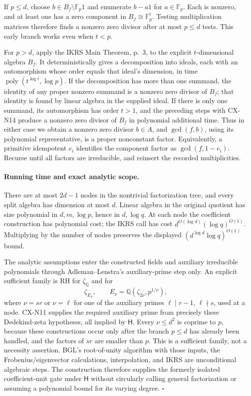 If \(p\leq d\), choose \(b\in B_f\setminus\mathbb F_p1\)
and enumerate \(b-a1\) for \(a\in\mathbb F_p\).
Each is nonzero, and at least one has a zero component in
\(B_f\cong\mathbb F_p^t\).
Testing multiplication matrices therefore finds a nonzero zero
divisor after at most \(p\leq d\) tests.
This early branch works even when \(t<p\).

For \(p>d\), apply the IKRS Main Theorem, p.~3, to the explicit
\(t\)-dimensional algebra \(B_f\).
It deterministically gives a decomposition into ideals, each
with an automorphism whose order equals that ideal's dimension,
in time \(\operatorname{poly}(t^{\log t},\log p)\).
If the decomposition has more than one summand, the identity of
any proper nonzero summand is a nonzero zero divisor of \(B_f\);
that identity is found by linear algebra in the supplied ideal.
If there is only one summand, its automorphism has order
\(t>1\), and the preceding steps with CX-N14 produce a nonzero
zero divisor of \(B_f\) in polynomial additional time.
Thus in either case we obtain a nonzero zero divisor \(b\in A\),
and \(\gcd(f,b)\), using its polynomial representative, is a
proper nonconstant factor.
Equivalently, a primitive idempotent \(e_i\) identifies the
component factor as \(\gcd(f,1-e_i)\).
Recurse until all factors are irreducible, and reinsert the
recorded multiplicities.

\paragraph{Running time and exact analytic scope.}
There are at most \(2d-1\) nodes in the nontrivial factorization
tree, and every split algebra has dimension at most \(d\).
Linear algebra in the original quotient has size polynomial in
\(d,m,\log p\), hence in \(d,\log q\).
At each node the coefficient construction has polynomial cost;
the IKRS call has cost
\(d^{O(\log d)}(\log q)^{O(1)}\).
Multiplying by the number of nodes preserves the displayed
\((d^{\log d}\log q)^{O(1)}\) bound.

The analytic assumptions enter the constructed fields and
auxiliary irreducible polynomials through Adleman--Lenstra's
auxiliary-prime step only.
An explicit sufficient family is RH for \(\zeta_{\mathbb Q}\)
and for
\[
 \zeta_{E_\nu},\qquad
 E_\nu=\mathbb Q(\zeta_{2\nu},p^{1/\nu}),
\]
where \(\nu=sr\) or \(\nu=\ell\) for one of the auxiliary
primes \(\ell\mid r-1\), \(\ell\nmid s\), used at a node.
CX-N11 supplies the required auxiliary prime from precisely
these Dedekind-zeta hypotheses, all implied by \(\mathsf H\).
Every \(\nu\leq d^2\) is coprime to \(p\), because these
constructions occur only after the branch \(p\leq d\) has
already been handled, and the factors of \(sr\) are smaller
than \(p\).
This is a sufficient family, not a necessity assertion.
BGL's root-of-unity algorithm with those inputs, the
Frobenius/eigenvector calculations, interpolation, and IKRS
are unconditional algebraic steps.
The construction therefore supplies the formerly isolated
coefficient-unit gate under \(\mathsf H\) without circularly
calling general factorization or assuming a polynomial bound
for its varying degree.
\hfill\(\square\)

